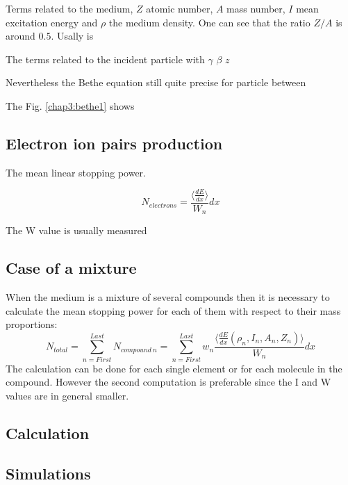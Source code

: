 \begin{refsection}
	Terms related to the medium, \(Z\) atomic number, \(A\) mass number, \(I\) mean excitation energy and \(\rho \) the medium density.
	One can see that the ratio \(Z/A\) is around \(0.5\).
	Usally is

	The terms related to the incident particle with \(\gamma\) \(\beta\) \(z\)

	Nevertheless the Bethe equation still quite precise for particle between

	The Fig. \ref{chap3:bethe1} shows

	

	\subsection{Electron ion pairs production}
	The mean linear stopping power.

	\cite[]{Weiss1955}
	\cite[]{Bichsel1979}
	\begin{equation}
		N_{electrons}= \frac{\big \langle \frac{dE}{dx} \big \rangle}{W_{n}} dx
	\end{equation}

	

	The W value is usually measured

	\subsection{Case of a mixture}
	When the medium is a mixture of several compounds then it is necessary to calculate the mean stopping power for each of them with respect to their mass proportions:
	\begin{equation}
		N_{total}= \sum_{n= First}^{Last} N_{compound\ n}= \sum_{n= First}^{Last} w_{n} \frac{\big \langle \frac{dE}{dx}\left(\rho_{n},I_{n},A_{n},Z_{n}\right) \big \rangle}{W_{n}} dx
	\end{equation}
	The calculation can be done for each single element or for each molecule in the compound.
	However the second computation is preferable since the I and W values are in general smaller.
	\subsection{Calculation}
	
	\subsection{Simulations}

\end{refsection}
